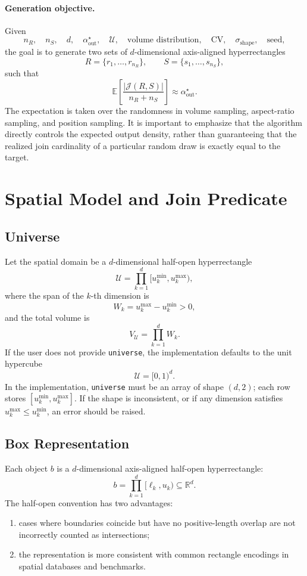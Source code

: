 \documentclass[11pt,a4paper]{article}
\newcommand{\Uset}{\mathcal{U}}
\newcommand{\Jset}{\mathcal{J}}
\newcommand{\Exp}{\mathbb{E}}
\newcommand{\code}[1]{\texttt{#1}}
\begin{document}
\paragraph{Generation objective.}
Given
\[
  n_R,\quad
  n_S,\quad
  d,\quad
  \alpha_{\mathrm{out}}^\star,\quad
  \Uset,\quad
  \text{volume distribution},\quad
  \mathrm{CV},\quad
  \sigma_{\mathrm{shape}},\quad
  \text{seed},
\]
the goal is to generate two sets of $d$-dimensional axis-aligned hyperrectangles
\[
  R=\{r_1,\dots,r_{n_R}\},\qquad
  S=\{s_1,\dots,s_{n_S}\},
\]
such that
\[
  \Exp\!\left[\frac{|\Jset(R,S)|}{n_R+n_S}\right]
  \approx
  \alpha_{\mathrm{out}}^\star.
\]
The expectation is taken over the randomness in volume sampling, aspect-ratio sampling, and position sampling. It is important to emphasize that the algorithm directly controls the expected output density, rather than guaranteeing that the realized join cardinality of a particular random draw is exactly equal to the target.

\section{Spatial Model and Join Predicate}

\subsection{Universe}

Let the spatial domain be a $d$-dimensional half-open hyperrectangle
\[
  \Uset=\prod_{k=1}^{d}[u_k^{\min},u_k^{\max}),
\]
where the span of the $k$-th dimension is
\[
  W_k=u_k^{\max}-u_k^{\min}>0,
\]
and the total volume is
\[
  V_{\Uset}=\prod_{k=1}^{d}W_k.
\]
If the user does not provide \code{universe}, the implementation defaults to the unit hypercube
\[
  \Uset=[0,1)^d.
\]
In the implementation, \code{universe} must be an array of shape $(d,2)$; each row stores $[u_k^{\min},u_k^{\max}]$. If the shape is inconsistent, or if any dimension satisfies $u_k^{\max}\le u_k^{\min}$, an error should be raised.

\subsection{Box Representation}

Each object $b$ is a $d$-dimensional axis-aligned half-open hyperrectangle:
\[
  b=\prod_{k=1}^{d}[\ell_k,u_k)\subseteq\mathbb{R}^{d}.
\]
The half-open convention has two advantages:
\begin{enumerate}
  \item cases where boundaries coincide but have no positive-length overlap are not incorrectly counted as intersections;
  \item the representation is more consistent with common rectangle encodings in spatial databases and benchmarks.
\end{enumerate}
\end{document}
